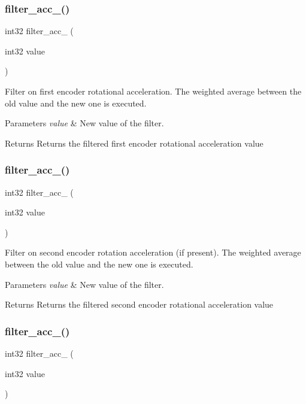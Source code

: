 \subsubsection{filter\+\_\+acc\+\_()}
{\footnotesize\ttfamily int32 filter\+\_\+acc\+\_ (\begin{DoxyParamCaption}\item[{int32}]{value }\end{DoxyParamCaption})}

Filter on first encoder rotational acceleration. The weighted average between the old value and the new one is executed.


\begin{DoxyParams}{Parameters}
{\em value} & New value of the filter.\\
\hline
\end{DoxyParams}
\begin{DoxyReturn}{Returns}
Returns the filtered first encoder rotational acceleration value 
\end{DoxyReturn}
\mbox{\label{utils_8c_a8578af55dde4ea39bb3525b417ff82e2}} 
\subsubsection{filter\+\_\+acc\+\_()}
{\footnotesize\ttfamily int32 filter\+\_\+acc\+\_ (\begin{DoxyParamCaption}\item[{int32}]{value }\end{DoxyParamCaption})}

Filter on second encoder rotation acceleration (if present). The weighted average between the old value and the new one is executed.


\begin{DoxyParams}{Parameters}
{\em value} & New value of the filter.\\
\hline
\end{DoxyParams}
\begin{DoxyReturn}{Returns}
Returns the filtered second encoder rotational acceleration value 
\end{DoxyReturn}
\mbox{\label{utils_8c_afbd3d0d191893b101de61bea2b04d7f2}} 
\subsubsection{filter\+\_\+acc\+\_()}
{\footnotesize\ttfamily int32 filter\+\_\+acc\+\_ (\begin{DoxyParamCaption}\item[{int32}]{value }\end{DoxyParamCaption})}

